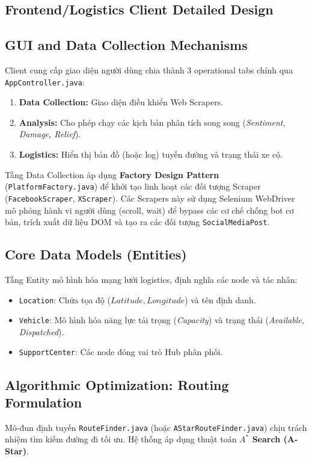 \documentclass[12pt,a4paper]{article}
\begin{document}
\begin{itemize}
\newpage

\section{Frontend/Logistics Client Detailed Design}

\subsection{GUI and Data Collection Mechanisms}
Client cung cấp giao diện người dùng chia thành 3 operational tabs chính qua \texttt{AppController.java}:
\begin{enumerate}
    \item \textbf{Data Collection:} Giao diện điều khiển Web Scrapers.
    \item \textbf{Analysis:} Cho phép chạy các kịch bản phân tích song song (\textit{Sentiment, Damage, Relief}).
    \item \textbf{Logistics:} Hiển thị bản đồ (hoặc log) tuyến đường và trạng thái xe cộ.
\end{enumerate}

Tầng Data Collection áp dụng \textbf{Factory Design Pattern} (\texttt{PlatformFactory.java}) để khởi tạo linh hoạt các đối tượng Scraper (\texttt{FacebookScraper}, \texttt{XScraper}). Các Scrapers này sử dụng Selenium WebDriver mô phỏng hành vi người dùng (scroll, wait) để bypass các cơ chế chống bot cơ bản, trích xuất dữ liệu DOM và tạo ra các đối tượng \texttt{SocialMediaPost}.

\subsection{Core Data Models (Entities)}
Tầng Entity mô hình hóa mạng lưới logistics, định nghĩa các node và tác nhân:
\begin{itemize}
    \item \texttt{Location}: Chứa tọa độ ($Latitude, Longitude$) và tên định danh.
    \item \texttt{Vehicle}: Mô hình hóa năng lực tải trọng (\textit{Capacity}) và trạng thái (\textit{Available, Dispatched}).
    \item \texttt{SupportCenter}: Các node đóng vai trò Hub phân phối.
\end{itemize}

\subsection{Algorithmic Optimization: Routing Formulation}
Mô-đun định tuyến \texttt{RouteFinder.java} (hoặc \texttt{AStarRouteFinder.java}) chịu trách nhiệm tìm kiếm đường đi tối ưu. Hệ thống áp dụng thuật toán \textbf{$A^*$ Search (A-Star)}.


\end{itemize}
\end{document}
